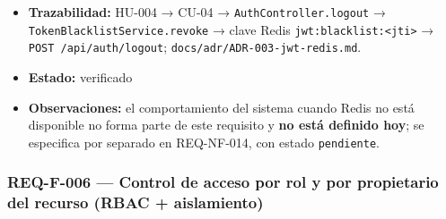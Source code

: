 \documentclass[
  spanish,
]{article}
\begin{document}
\begin{itemize}
  (criterio 2).
\item
  \textbf{Trazabilidad:} HU-004 → CU-04 → \texttt{Auth\allowbreak{}Controller.\allowbreak{}logout}
  → \texttt{Token\allowbreak{}Blacklist\allowbreak{}Service.\allowbreak{}revoke} → clave Redis
  \texttt{jwt:blacklist:\textless{}\allowbreak{}jti\textgreater{}} →
  \texttt{POST\ /\allowbreak{}api/\allowbreak{}auth/\allowbreak{}logout};
  \texttt{docs/\allowbreak{}adr/\allowbreak{}ADR-\allowbreak{}003-\allowbreak{}jwt-\allowbreak{}redis.\allowbreak{}md}.
\item
  \textbf{Estado:} verificado
\item
  \textbf{Observaciones:} el comportamiento del sistema cuando Redis no
  está disponible no forma parte de este requisito y \textbf{no está
  definido hoy}; se especifica por separado en REQ-NF-014, con estado
  \texttt{pendiente}.
\end{itemize}

\subsubsection{REQ-F-006 --- Control de acceso por rol y por propietario
del recurso (RBAC +
aislamiento)}\label{req-f-006-control-de-acceso-por-rol-y-por-propietario-del-recurso-rbac-aislamiento}
\end{document}

